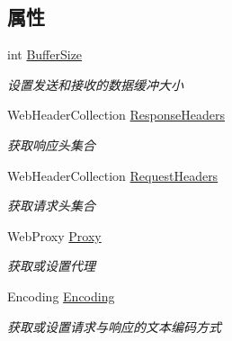 \subsection*{属性}
\begin{DoxyCompactItemize}
\item 
int \hyperlink{class_x_c_l_net_tools_1_1_file_handler_1_1_web_client_a192f27c95b8274758ca9d68c620de7c3}{Buffer\+Size}
\begin{DoxyCompactList}\small\item\em 设置发送和接收的数据缓冲大小 \end{DoxyCompactList}\item 
Web\+Header\+Collection \hyperlink{class_x_c_l_net_tools_1_1_file_handler_1_1_web_client_a3d00d3457c23ce30274af963f4cab6bb}{Response\+Headers}
\begin{DoxyCompactList}\small\item\em 获取响应头集合 \end{DoxyCompactList}\item 
Web\+Header\+Collection \hyperlink{class_x_c_l_net_tools_1_1_file_handler_1_1_web_client_a89d4bf2af70a2a0991904b1b61c8dd1d}{Request\+Headers}
\begin{DoxyCompactList}\small\item\em 获取请求头集合 \end{DoxyCompactList}\item 
Web\+Proxy \hyperlink{class_x_c_l_net_tools_1_1_file_handler_1_1_web_client_ac2f17eefdc2372eb01a6be915d19c0ba}{Proxy}
\begin{DoxyCompactList}\small\item\em 获取或设置代理 \end{DoxyCompactList}\item 
Encoding \hyperlink{class_x_c_l_net_tools_1_1_file_handler_1_1_web_client_a9bd02ab7f0198d34a44487c5d8c02f19}{Encoding}
\begin{DoxyCompactList}\small\item\em 获取或设置请求与响应的文本编码方式 \end{DoxyCompactList}\item 

\end{DoxyCompactItemize}
